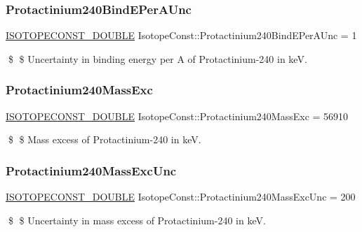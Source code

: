 \subsubsection{\texorpdfstring{Protactinium240\+Bind\+E\+Per\+A\+Unc}{Protactinium240BindEPerAUnc}}
{\footnotesize\ttfamily \mbox{\hyperlink{group___isotope_const-_macros_ga8f45a7272ce02c0b4c65c44636ed719a}{I\+S\+O\+T\+O\+P\+E\+C\+O\+N\+S\+T\+\_\+\+D\+O\+U\+B\+LE}} Isotope\+Const\+::\+Protactinium240\+Bind\+E\+Per\+A\+Unc = 1}

\$ \$ Uncertainty in binding energy per A of Protactinium-\/240 in keV. \mbox{\label{group___isotope_const-_protactinium-_pa240_ga277ec2b76bce090e8a1622934ebb1e22}} 
\subsubsection{\texorpdfstring{Protactinium240\+Mass\+Exc}{Protactinium240MassExc}}
{\footnotesize\ttfamily \mbox{\hyperlink{group___isotope_const-_macros_ga8f45a7272ce02c0b4c65c44636ed719a}{I\+S\+O\+T\+O\+P\+E\+C\+O\+N\+S\+T\+\_\+\+D\+O\+U\+B\+LE}} Isotope\+Const\+::\+Protactinium240\+Mass\+Exc = 56910}

\$ \$ Mass excess of Protactinium-\/240 in keV. \mbox{\label{group___isotope_const-_protactinium-_pa240_ga2e13ee61a09a22cd605dc2c1b57209bd}} 
\subsubsection{\texorpdfstring{Protactinium240\+Mass\+Exc\+Unc}{Protactinium240MassExcUnc}}
{\footnotesize\ttfamily \mbox{\hyperlink{group___isotope_const-_macros_ga8f45a7272ce02c0b4c65c44636ed719a}{I\+S\+O\+T\+O\+P\+E\+C\+O\+N\+S\+T\+\_\+\+D\+O\+U\+B\+LE}} Isotope\+Const\+::\+Protactinium240\+Mass\+Exc\+Unc = 200}

\$ \$ Uncertainty in mass excess of Protactinium-\/240 in keV. \mbox{\label{group___isotope_const-_protactinium-_pa240_ga6c12a59fb053db897129a25f2e2f6962}} 
